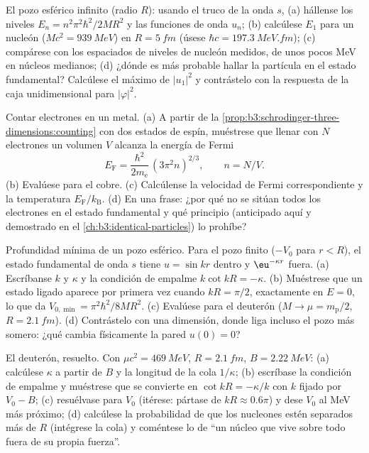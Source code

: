 \begin{exercise}[$\star\star$]\label{exo:b3:schrodinger-three-dimensions:7}
El pozo esférico infinito (radio $R$): usando el truco de la onda $s$,
(a) hállense los niveles $E_n = n^2\pi^2\hbar^2/2MR^2$ y las funciones de onda
$u_n$; (b) calcúlese $E_1$ para un nucleón ($Mc^2 =
\qty{939}{MeV}$) en $R = \qty{5}{fm}$ (úsese $\hbar c =
\qty{197.3}{MeV.fm}$); (c) compárese con los espaciados de niveles de
nucleón medidos, de unos pocos MeV en núcleos medianos; (d) ¿dónde es más
probable hallar la partícula en el estado fundamental? Calcúlese el máximo de
$|u_1|^2$ y contrástelo con la respuesta de la caja unidimensional para
$|\varphi|^2$.
\end{exercise}

\begin{exercise}[$\star\star$]\label{exo:b3:schrodinger-three-dimensions:8}
Contar electrones en un metal. (a) A partir de la
\cref{prop:b3:schrodinger-three-dimensions:counting} con dos estados de
espín, muéstrese que llenar con $N$ electrones un volumen $V$ alcanza la
energía de Fermi
\[
E_{\text{F}} = \frac{\hbar^2}{2m_{\text{e}}}\,(3\pi^2n)^{2/3} ,
\qquad n = N/V .
\]
(b) Evalúese para el cobre. (c) Calcúlense la velocidad de Fermi
correspondiente y la temperatura $E_{\text{F}}/k_{\text{B}}$. (d) En una
frase: ¿por qué no se sitúan todos los electrones en el estado fundamental y
qué principio (anticipado aquí y demostrado en el
\cref{ch:b3:identical-particles}) lo prohíbe?
\end{exercise}

\begin{exercise}[$\star\star$]\label{exo:b3:schrodinger-three-dimensions:9}
Profundidad mínima de un pozo esférico. Para el pozo finito ($-V_0$ para
$r < R$), el estado fundamental de onda $s$ tiene $u = \sin kr$ dentro y
$\eu^{-\kappa r}$ fuera. (a) Escríbanse $k$ y $\kappa$ y la
condición de empalme $k\cot kR = -\kappa$. (b) Muéstrese que un estado
ligado aparece por primera vez cuando $kR = \pi/2$, exactamente en $E = 0$,
lo que da $V_{0,\min} = \pi^2\hbar^2/8MR^2$. (c) Evalúese para el deuterón
($M \to \mu = m_{\text{p}}/2$, $R = \qty{2.1}{fm}$). (d) Contrástelo
con una dimensión, donde liga incluso el pozo más somero: ¿qué cambia
físicamente la pared $u(0) = 0$?
\end{exercise}

\begin{exercise}[$\star\star\star$]\label{exo:b3:schrodinger-three-dimensions:10}
El deuterón, resuelto. Con $\mu c^2 = \qty{469}{MeV}$, $R =
\qty{2.1}{fm}$, $B = \qty{2.22}{MeV}$: (a) calcúlese $\kappa$ a partir de $B$
y la longitud de la cola $1/\kappa$; (b) escríbase la condición de empalme y
muéstrese que se convierte en $\cot kR = -\kappa/k$ con $k$ fijado por
$V_0 - B$; (c) resuélvase para $V_0$ (itérese: pártase de $kR \approx 0.6\pi$) y
dese $V_0$ al MeV más próximo; (d) calcúlese la probabilidad de que los
nucleones estén separados más de $R$ (intégrese la cola) y coméntese lo de ``un
núcleo que vive sobre todo fuera de su propia fuerza''.
\end{exercise}

